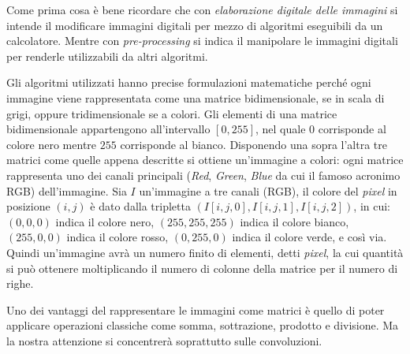 Come prima cosa è bene ricordare che con \textit{elaborazione digitale delle immagini} si intende il modificare immagini digitali per mezzo di algoritmi eseguibili da un calcolatore.
Mentre con \textit{pre-processing} si indica il manipolare le immagini digitali per renderle utilizzabili da altri algoritmi.

Gli algoritmi utilizzati hanno precise formulazioni matematiche perché ogni immagine viene rappresentata come una matrice bidimensionale, se in scala di grigi, oppure tridimensionale se a colori.
Gli elementi di una matrice bidimensionale appartengono all'intervallo $[0,255]$, nel quale $0$ corrisponde al colore nero mentre $255$ corrisponde al bianco.
Disponendo una sopra l'altra tre matrici come quelle appena descritte si ottiene un'immagine a colori: ogni matrice rappresenta uno dei canali principali (\textit{Red}, \textit{Green}, \textit{Blue} da cui il famoso acronimo RGB) dell'immagine.
Sia $I$ un'immagine a tre canali (RGB), il colore del \textit{pixel} in posizione $(i,j)$ è dato dalla tripletta $(I[i,j,0], I[i,j,1], I[i,j,2])$, in cui: $(0,0,0)$ indica il colore nero, $(255,255,255)$ indica il colore bianco, $(255,0,0)$ indica il colore rosso, $(0,255,0)$ indica il colore verde, e così via.
Quindi un'immagine avrà un numero finito di elementi, detti \textit{pixel}, la cui quantità si può ottenere moltiplicando il numero di colonne della matrice per il numero di righe. %


Uno dei vantaggi del rappresentare le immagini come matrici è quello di poter applicare operazioni classiche come somma, sottrazione, prodotto e divisione.
Ma la nostra attenzione si concentrerà soprattutto sulle convoluzioni.

